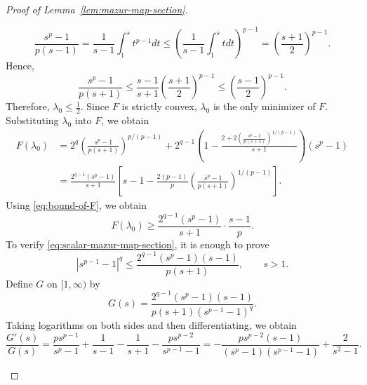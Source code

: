 \documentclass[11pt,a4paper]{amsart}
\theoremstyle{plain}
\theoremstyle{definition}
\begin{document}
\begin{proof}[Proof of Lemma~\ref{lem:mazur-map-section}]
\begin{enumerate}[wide =0pt, labelwidth= 1.1cm]
\begin{equation}
    \label{eq:Jen-with-s}
        \frac{s^p-1}{p(s-1)} =\frac{1}{s-1}\int_1^s t^{p-1} dt \leq \left(\frac{1}{s-1} \int_1^s t d t \right)^{p-1} = \left(\frac{s+1}{2}\right)^{p-1}.
    \end{equation}
    Hence,
    \begin{equation} 
    \frac{s^p-1}{p(s+1)}
\leq
    \frac{s-1}{s+1}
    \left(\frac{s+1}{2}\right)^{p-1}
    \leq
    \left(\frac{s-1}{2}\right)^{p-1}. \label{eq:bound-of-F}
    \end{equation}
    Therefore, $\lambda_0 \leq \frac{1}{2}$. Since $F$ is strictly convex, $\lambda_0$ is the only minimizer of $F$. 
    Substituting $\lambda_0$ into $F$, we obtain 
    \begin{align}
        F\left(\lambda_0\right)&=2^q  \left(\frac{s^p-1}{p(s+1)}\right)^{p /(p-1)} 
         +2^{q-1}\left(1-\frac{2+2\left(\frac{s^p-1}{p(s+1)}\right)^{1 /(p-1)}}{s+1}\right)\left(s^p-1\right)
         \\ & 
         =\frac{2^{q-1}\left(s^p-1\right)}{s+1}\left[s-1-\frac{2(p-1)}{p}\left(\frac{s^p-1}{p(s+1)}\right)^{1 /(p-1)}\right] .
    \end{align}
    Using \eqref{eq:bound-of-F}, we obtain
    \[
        F(\lambda_0) \geq \frac{2^{q-1}\left(s^p-1\right)}{s+1} \cdot \frac{s-1}{p}.
    \]
    To verify \eqref{eq:scalar-mazur-map-section}, it is enough to prove
    \begin{equation} \label{eq:to-prove-final-s}
        |s^{p-1} -1|^q \leq \frac{2^{q-1}\left(s^p-1\right)(s-1)}{p(s+1)}, \qquad s> 1.
    \end{equation}
    Define $G$ on $[1,\infty)$ by
    \[
        G(s)=
        \frac{
            2^{q-1}(s^p-1)(s-1)
        }{
            p(s+1)(s^{p-1}-1)^q
        }.
    \]
    Taking logarithms on both sides and then differentiating, we obtain
    \[
        \frac{G'(s)}{G(s)}
   =
    \frac{p s^{p-1}}{s^p-1}
    +
    \frac{1}{s-1}
    -
    \frac{1}{s+1}
    -
    \frac{p s^{p-2}}{s^{p-1}-1}
=
    -\frac{
        p s^{p-2}(s-1)
    }{
        (s^p-1)(s^{p-1}-1)
    }
    +
    \frac{2}{s^2-1}.
\]
\end{enumerate}
\end{proof}
\end{document}
